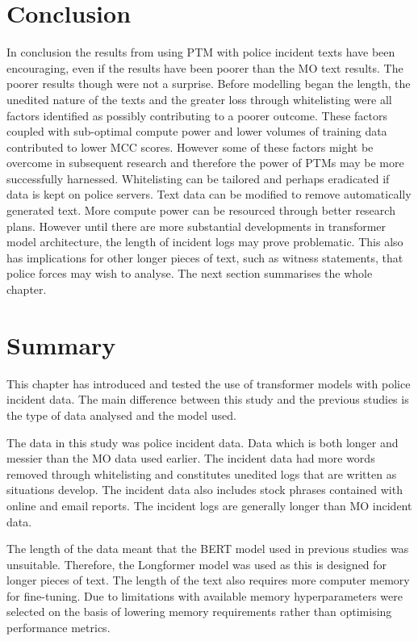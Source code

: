 \section{Conclusion} In conclusion the results from using PTM with police incident texts have been encouraging, even if the results have been poorer than the MO text results. The poorer results though were not a surprise. Before modelling began the length, the unedited nature of the texts and the greater loss through whitelisting were all factors identified as possibly contributing to a poorer outcome. These factors coupled with sub-optimal compute power and lower volumes of training data contributed to lower MCC scores. However some of these factors might be overcome in subsequent research and therefore the power of PTMs may be more successfully harnessed. Whitelisting can be tailored and perhaps eradicated if data is kept on police servers. Text data can be modified to remove automatically generated text. More compute power can be resourced through better research plans. However until there are more substantial developments in transformer model architecture, the length of incident logs may prove problematic. This also has implications for other longer pieces of text, such as witness statements, that police forces may wish to analyse. The next section summarises the whole chapter.

\section{Summary} This chapter has introduced and tested the use of transformer models with police incident data. The main difference between this study and the previous studies is the type of data analysed and the model used. 

The data in this study was police incident data. Data which is both longer and messier than the MO data used earlier. The incident data had more words removed through whitelisting and constitutes unedited logs that are written as situations develop. The incident data also includes stock phrases contained with online and email reports. The incident logs are generally longer than MO incident data.

The length of the data meant that the BERT model used in previous studies was unsuitable. Therefore, the Longformer model was used as this is designed for longer pieces of text. The length of the text also requires more computer memory for fine-tuning. Due to limitations with  available memory hyperparameters were selected on the basis of lowering memory requirements rather than optimising performance metrics.

